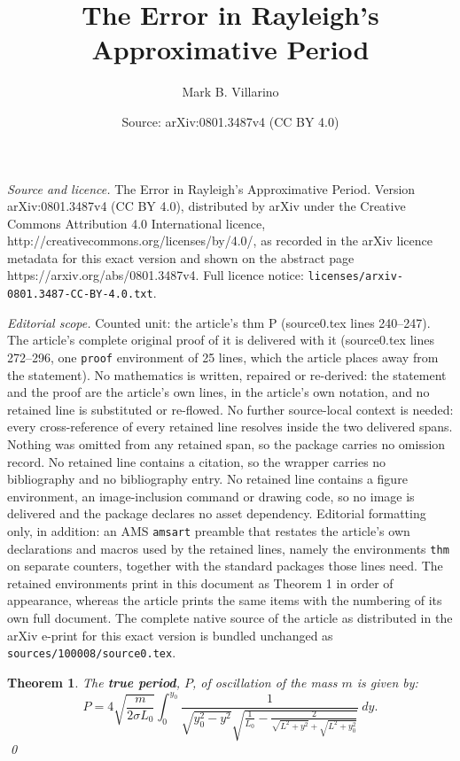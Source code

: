 \documentclass[10pt,a4paper]{amsart}
\title{The Error in Rayleigh's Approximative Period}
\author{Mark B. Villarino}
\date{Source: arXiv:0801.3487v4 (CC BY 4.0)}
\newtheorem{thm}{Theorem}
\begin{document}
\maketitle

\noindent\emph{Source and licence.} The Error in Rayleigh's Approximative Period. Version arXiv:0801.3487v4 (CC BY 4.0), distributed by arXiv under the Creative Commons Attribution 4.0 International licence, http://creativecommons.org/licenses/by/4.0/, as recorded in the arXiv licence metadata for this exact version and shown on the abstract page https://arxiv.org/abs/0801.3487v4. Full licence notice: \texttt{licenses/arxiv-0801.3487-CC-BY-4.0.txt}.\par\smallskip

\noindent\textit{Editorial scope.} Counted unit: the article's thm P (source0.tex lines 240--247). The article's complete original proof of it is delivered with it (source0.tex lines 272--296, one \texttt{proof} environment of 25 lines, which the article places away from the statement). No mathematics is written, repaired or re-derived: the statement and the proof are the article's own lines, in the article's own notation, and no retained line is substituted or re-flowed.  No further source-local context is needed: every cross-reference of every retained line resolves inside the two delivered spans.  Nothing was omitted from any retained span, so the package carries no omission record.  No retained line contains a citation, so the wrapper carries no bibliography and no bibliography entry.  No retained line contains a figure environment, an image-inclusion command or drawing code, so no image is delivered and the package declares no asset dependency.  Editorial formatting only, in addition: an AMS \texttt{amsart} preamble that restates the article's own declarations and macros used by the retained lines, namely the environments \texttt{thm} on separate counters, together with the standard packages those lines need.  The retained environments print in this document as Theorem 1 in order of appearance, whereas the article prints the same items with the numbering of its own full document.  The complete native source of the article as distributed in the arXiv e-print for this exact version is bundled unchanged as \texttt{sources/100008/source0.tex}.
\begin{thm}
The \textbf{true period}, $P$, of oscillation of the mass $m$ is given by:
\begin{equation}
\label{P}
\boxed{P=4\sqrt{\frac{m}{2\sigma L_0}}\int_{0}^{y_0}\frac{1}{\sqrt{y_0^2-y^2}\sqrt{\frac{1}{L_0}-\frac{2}{\sqrt{L^2+y^2}+\sqrt{L^2+y_0^2}}}}~dy.}
\end{equation}
\qed
\end{thm}
\end{document}
